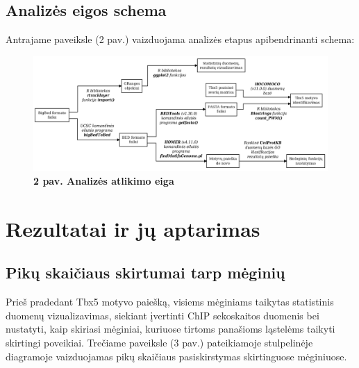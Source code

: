 \documentclass[12pt]{article}
\begin{document}
\subsection{Analizės eigos schema}
Antrajame paveiksle (2 pav.) vaizduojama analizės etapus apibendrinanti schema:
\begin{figure}[htb]
    \begin{center}
        \includegraphics[width=1\linewidth]{../Figures/analysis_scheme.png}
        \vspace{-2\baselineskip}
        \caption*{\small\textbf{2 pav. Analizės atlikimo eiga}}
    \end{center}
\end{figure}

\newpage



\section{Rezultatai ir jų aptarimas}
\subsection{Pikų skaičiaus skirtumai tarp mėginių}
Prieš pradedant Tbx5 motyvo paiešką, visiems mėginiams taikytas statistinis
duomenų vizualizavimas, siekiant įvertinti ChIP sekoskaitos duomenis bei
nustatyti, kaip skiriasi mėginiai, kuriuose tirtoms panašioms ląstelėms
taikyti skirtingi poveikiai.
Trečiame paveiksle (3 pav.) pateikiamoje stulpelinėje diagramoje vaizduojamas
pikų skaičiaus pasiskirstymas skirtinguose mėginiuose.
\end{document}
